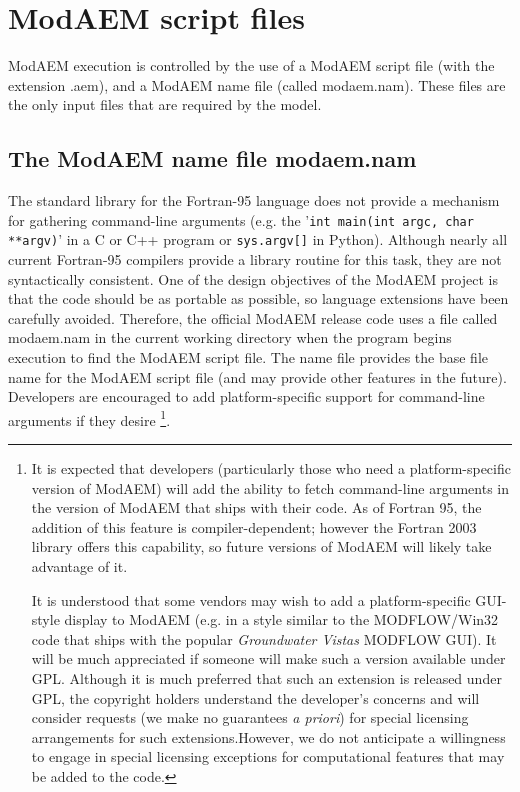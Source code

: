 \chapter{ModAEM script files\label{cha:script-files} }

ModAEM execution is controlled by the use of a ModAEM
script file (with the extension \textsf{.aem}), and
a ModAEM name file (called \textsf{modaem.nam}).
These files are the only input files that are required by the model.


\section{The ModAEM name file \textsf{modaem.nam\label{sub:name-file} }}

The standard library for the Fortran-95 language does not provide
a mechanism for gathering command-line arguments (e.g. the '\texttt{int
main(int argc, char {*}{*}argv)}' in a C or C++ program or \texttt{sys.argv{[}{]}}
in Python). Although nearly all current Fortran-95 compilers provide
a library routine for this task, they are not syntactically consistent.
One of the design objectives of the ModAEM project is that the code
should be as portable as possible, so language extensions have been
carefully avoided. Therefore, the official
ModAEM release code uses a file called \textsf{modaem.nam} in the
current working directory when the program begins execution to find
the ModAEM script file. The name file provides the base file name
for the ModAEM script file (and may provide other features in the
future). Developers are encouraged to add platform-specific support
for command-line arguments if they desire \footnote{It is expected that developers (particularly those who need a platform-specific
version of ModAEM) will add the ability to fetch command-line arguments
in the version of ModAEM that ships with their code. As of Fortran 95, the addition of this feature is compiler-dependent; however the Fortran 2003
library offers this capability, so future versions of ModAEM will likely take advantage of it. 

It is understood that some vendors may wish to add a platform-specific
GUI-style display to ModAEM (e.g. in a style similar to the MODFLOW/Win32
code that ships with the popular \emph{Groundwater Vistas} MODFLOW
GUI). It will be much appreciated if someone will make such a version
available under GPL. Although it is much preferred that such an extension
is released under GPL, the copyright holders understand the developer's
concerns and will consider requests (we make no guarantees \emph{a
priori}) for special licensing arrangements for such extensions.However,
we do not anticipate a willingness to engage in special licensing
exceptions for computational features that may be added to the code.%
}.

